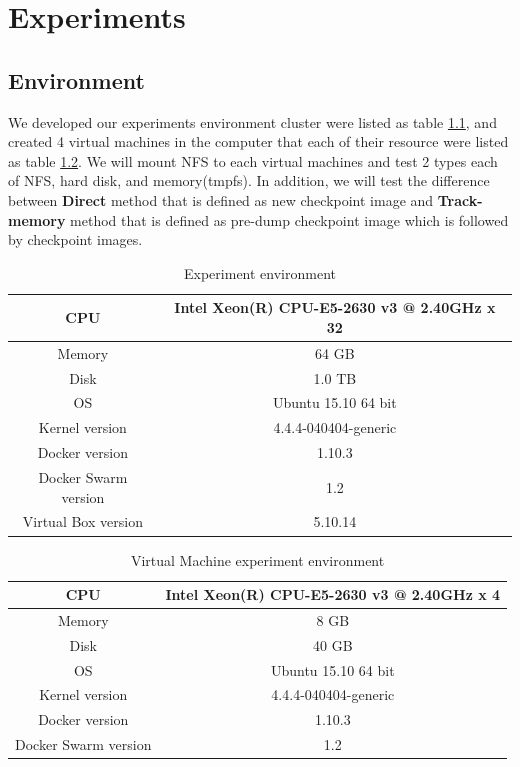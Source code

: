 \chapter{Experiments}
\label{chap:experiments}
\section{Environment}
We developed our experiments environment cluster were listed as table \ref{talbe:Host}, and created 4 virtual machines in the computer that each of their resource were listed as table \ref{talbe:Virtual Machine}. We will mount NFS to each virtual machines and test 2 types each of NFS, hard disk, and memory(tmpfs). 
In addition, we will test the difference between \textbf{Direct} method that is defined as new checkpoint image and \textbf{Track-memory} method that is defined as pre-dump checkpoint image which is followed by checkpoint images.

\begin{table}[hbtp]
\begin{center}
\begin{tabular}{|c|c|} \hline
CPU & Intel Xeon(R) CPU-E5-2630 v3 @ 2.40GHz x 32 \\ \hline
Memory & 64 GB \\ \hline
Disk & 1.0 TB \\ \hline
OS & Ubuntu 15.10 64 bit \\ \hline
Kernel version & 4.4.4-040404-generic \\ \hline
Docker version & 1.10.3 \\ \hline
Docker Swarm version & 1.2 \\ \hline
Virtual Box version & 5.10.14 \\ \hline
\end{tabular}
\end{center}
\caption{Experiment environment}
\label{talbe:Host}
\end{table}

\begin{table}[hbtp]
\begin{center}
\begin{tabular}{|c|c|} \hline
CPU & Intel Xeon(R) CPU-E5-2630 v3 @ 2.40GHz x 4 \\ \hline
Memory & 8 GB \\ \hline
Disk & 40 GB \\ \hline
OS & Ubuntu 15.10 64 bit \\ \hline
Kernel version & 4.4.4-040404-generic \\ \hline
Docker version & 1.10.3 \\ \hline
Docker Swarm version & 1.2 \\ \hline
\end{tabular}
\end{center}
\caption{Virtual Machine experiment environment}
\label{talbe:Virtual Machine}
\end{table}


